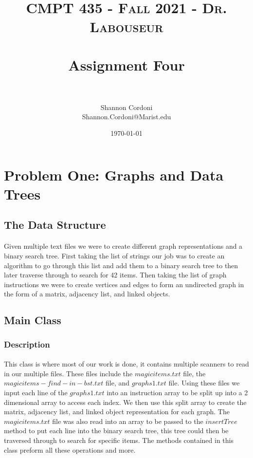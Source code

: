 \documentclass[letterpaper, 10pt,DIV=13]{scrartcl}
\title{	
   \normalfont \normalsize 
   \textsc{CMPT 435 - Fall 2021 - Dr. Labouseur} \\[10pt] %
   \horrule{0.5pt} \\[0.25cm] 	%
   \huge Assignment Four  \\     	    %
   \horrule{0.5pt} \\[0.25cm] 	%
}
\author{Shannon Cordoni \\ \normalsize Shannon.Cordoni@Marist.edu}
\date{\normalsize\today} 	%
\numberwithin{equation}{section} %
\numberwithin{figure}{section} %
\numberwithin{table}{section} %
\begin{document}
\maketitle %

\section{Problem One: Graphs and Data Trees}

\subsection{The Data Structure}
\paragraph{} Given multiple text files we were to create different graph representations and a binary search tree. First taking the list of strings our job was to create an algorithm to go through this list and add them to a binary search tree to then later traverse through to search for 42 items. Then taking the list of graph instructions we were to create vertices and edges to form an undirected graph in the form of a matrix, adjacency list, and linked objects. \\


\subsection{Main Class}

\subsubsection{Description}
\paragraph{}This class is where most of our work is done, it contains multiple scanners to read in our multiple files. These files include the $magicitems.txt$ file, the $magicitems-find-in-bst.txt$ file, and $graphs1.txt$ file. Using these files we input each line of the $graphs1.txt$ into an instruction array to be split up into a 2 dimensional array to access each index. We then use this split array to create the matrix, adjacency list, and linked object representation for each graph. The $magicitems.txt$ file was also read into an array to be passed to the $insertTree$ method to put each line into the binary search tree, this tree could then be traversed through to search for specific items. The methods contained in this class preform all these operations and more. 
\end{document}
